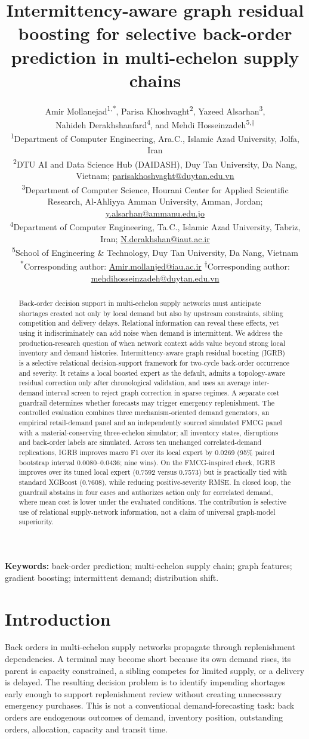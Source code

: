 \documentclass[11pt,a4paper]{article}
\title{Intermittency-aware graph residual boosting for selective back-order prediction in multi-echelon supply chains}
\author{\parbox{0.96\textwidth}{\centering
Amir Mollanejad\textsuperscript{1,*}, Parisa Khoshvaght\textsuperscript{2}, Yazeed Alsarhan\textsuperscript{3},\\
Nahideh Derakhshanfard\textsuperscript{4}, and Mehdi Hosseinzadeh\textsuperscript{5,$\dagger$}\\[5pt]
\small\textsuperscript{1}Department of Computer Engineering, Ara.C., Islamic Azad University, Jolfa, Iran\\
\small\textsuperscript{2}DTU AI and Data Science Hub (DAIDASH), Duy Tan University, Da Nang, Vietnam; \href{mailto:parisakhoshvaght@duytan.edu.vn}{parisakhoshvaght@duytan.edu.vn}\\
\small\textsuperscript{3}Department of Computer Science, Hourani Center for Applied Scientific Research, Al-Ahliyya Amman University, Amman, Jordan; \href{mailto:y.alsarhan@ammanu.edu.jo}{y.alsarhan@ammanu.edu.jo}\\
\small\textsuperscript{4}Department of Computer Engineering, Ta.C., Islamic Azad University, Tabriz, Iran; \href{mailto:N.derakhshan@iaut.ac.ir}{N.derakhshan@iaut.ac.ir}\\
\small\textsuperscript{5}School of Engineering \& Technology, Duy Tan University, Da Nang, Vietnam\\[5pt]
\small\textsuperscript{*}Corresponding author: \href{mailto:Amir.mollanjed@iau.ac.ir}{Amir.mollanjed@iau.ac.ir}\quad
\textsuperscript{$\dagger$}Corresponding author: \href{mailto:mehdihosseinzadeh@duytan.edu.vn}{mehdihosseinzadeh@duytan.edu.vn}}}
\date{}
\begin{document}
\maketitle
\begin{abstract}
Back-order decision support in multi-echelon supply networks must anticipate shortages created not only by local demand but also by upstream constraints, sibling competition and delivery delays. Relational information can reveal these effects, yet using it indiscriminately can add noise when demand is intermittent. We address the production-research question of when network context adds value beyond strong local inventory and demand histories. Intermittency-aware graph residual boosting (IGRB) is a selective relational decision-support framework for two-cycle back-order occurrence and severity. It retains a local boosted expert as the default, admits a topology-aware residual correction only after chronological validation, and uses an average inter-demand interval screen to reject graph correction in sparse regimes. A separate cost guardrail determines whether forecasts may trigger emergency replenishment. The controlled evaluation combines three mechanism-oriented demand generators, an empirical retail-demand panel and an independently sourced simulated FMCG panel with a material-conserving three-echelon simulator; all inventory states, disruptions and back-order labels are simulated. Across ten unchanged correlated-demand replications, IGRB improves macro F1 over its local expert by 0.0269 (95\% paired bootstrap interval 0.0080--0.0436; nine wins). On the FMCG-inspired check, IGRB improves over its tuned local expert (0.7592 versus 0.7573) but is practically tied with standard XGBoost (0.7608), while reducing positive-severity RMSE. In closed loop, the guardrail abstains in four cases and authorizes action only for correlated demand, where mean cost is lower under the evaluated conditions. The contribution is selective use of relational supply-network information, not a claim of universal graph-model superiority.
\end{abstract}
\noindent\textbf{Keywords:} back-order prediction; multi-echelon supply chain; graph features; gradient boosting; intermittent demand; distribution shift.

\section{Introduction}
Back orders in multi-echelon supply networks propagate through replenishment dependencies. A terminal may become short because its own demand rises, its parent is capacity constrained, a sibling competes for limited supply, or a delivery is delayed. The resulting decision problem is to identify impending shortages early enough to support replenishment review without creating unnecessary emergency purchases. This is not a conventional demand-forecasting task: back orders are endogenous outcomes of demand, inventory position, outstanding orders, allocation, capacity and transit time.
\end{document}
